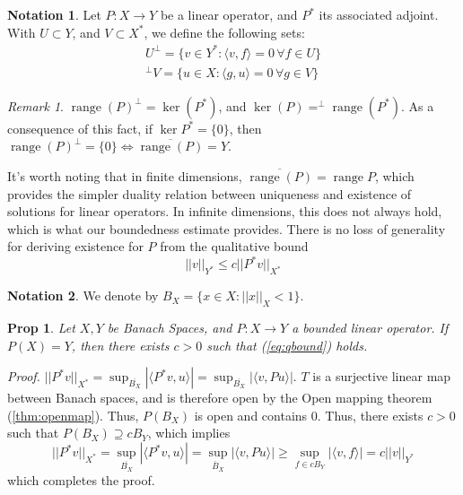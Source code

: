 \documentclass[letterpaper,10pt]{article}
\DeclareMathOperator{\rg}{range}
\theoremstyle{definition}
\newtheorem*{ntt}{Notation}
\theoremstyle{remark}
\newtheorem*{rmk}{Remark}
\theoremstyle{plain}
\newtheorem{prop}[thm]{Prop}
\renewenvironment{proof}{
    \vspace{5pt}
    \begin{mdframed}[bottomline=false,topline=false,rightline=false, skipabove=0]
    \noindent\textit{Proof.}}
{
    \hspace{\fill}\qedsymbol
    \end{mdframed}
}
\begin{document}
\begin{ntt}
    Let $P:X\rightarrow Y$ be a linear operator, and $P^*$ its associated adjoint.
    With $U\subset Y$, and $V\subset X^*$, we define the following sets:
    \begin{align*}
        U^\perp=\{v\in Y^*:\langle v,f\rangle=0\, \forall f\in U\}
        \\
        ^\perp V=\{u\in X:\langle g,u\rangle=0\, \forall g\in V\}
    \end{align*}
\end{ntt}
\begin{rmk}
    $\rg(P)^\perp=\ker(P^*)$, and $\ker(P)=^\perp\rg(P^*)$. 
    As a consequence of this fact, if $\ker P^*=\{0\}$, 
    then $\rg(P)^\perp=\{0\}\Leftrightarrow\overline{\rg(P)}=Y$.

    It's worth noting that in finite dimensions, $\overline{\rg(P)}=\rg P$,
    which provides the simpler duality relation between uniqueness and existence
    of solutions for linear operators.
    In infinite dimensions, this does not always hold, which is what our boundedness
    estimate provides. There is no loss of generality for deriving existence for $P$
    from the qualitative bound
    \begin{equation}\label{eq:qbound}
        ||v||_{Y^*}\leq c||P^*v||_{X^*}
    \end{equation}
\end{rmk}
\begin{ntt}
    We denote by $B_X=\{x\in X:||x||_X<1\}$.
\end{ntt}
\begin{prop}\label{prop:uqexistest}
    Let $X,Y$ be Banach Spaces, and $P:X\rightarrow Y$ a bounded linear operator.
    If $P(X)=Y$, then there exists $c>0$ such that (\ref{eq:qbound}) holds.
\end{prop}
\begin{proof}
    $||P^*v||_{X^*}=\sup_{\overline{B_X}}|\langle P^*v,u\rangle|=\sup_{\overline{B_X}}|\langle v, Pu\rangle|$.
    $T$ is a surjective linear map between Banach spaces, and is therefore open by the 
    Open mapping theorem (\ref{thm:openmap}).
    Thus, $P(B_X)$ is open and contains $0$. Thus, there exists $c>0$ such that 
    $P(B_X)\supseteq cB_Y$, which implies
    $$
    ||P^*v||_{X^*}=\sup_{\overline{B_X}}|\langle P^*v,u\rangle|
    =\sup_{\overline B_X}|\langle v,Pu\rangle|
    \geq
    \sup_{f\in cB_Y}|\langle v,f\rangle|=c||v||_{Y^*}
    $$
    which completes the proof.
\end{proof}
\end{document}
